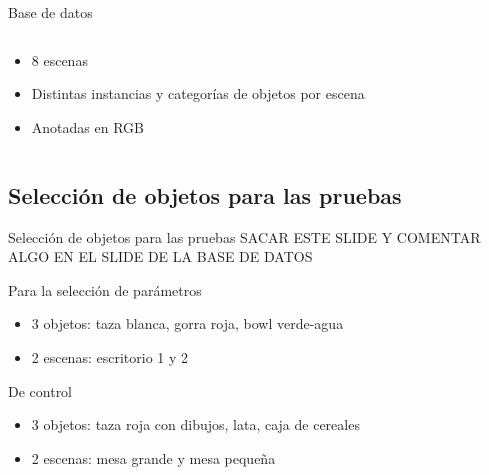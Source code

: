 \documentclass[]{beamer}
\begin{document}
\begin{frame}{Base de datos}
\begin{columns}[t]
\begin{column}{5cm}
            \begin{itemize}
                \item 8 escenas
                \item Distintas instancias y categorías de objetos por escena
                \item Anotadas en RGB
            \end{itemize}

        \end{column}
    \end{columns}
\end{frame}

\subsection{Selección de objetos para las pruebas}
\begin{frame}{Selección de objetos para las pruebas}
    SACAR ESTE SLIDE Y COMENTAR ALGO EN EL SLIDE DE LA BASE DE DATOS

    \begin{block}{Para la selección de parámetros}
        \begin{itemize}
            \item 3 objetos: taza blanca, gorra roja, bowl verde-agua
            \item 2 escenas: escritorio 1 y 2
        \end{itemize}
    \end{block}

    \begin{block}{De control}
        \begin{itemize}
            \item 3 objetos: taza roja con dibujos, lata, caja de cereales
            \item 2 escenas: mesa grande y mesa pequeña
        \end{itemize}
    \end{block}
\end{frame}
\end{document}
